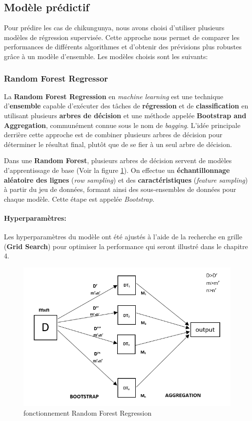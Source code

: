 \subsection{Modèle prédictif}
Pour prédire les cas de chikungunya, nous avons choisi d'utiliser plusieurs modèles de régression supervisée. Cette approche nous permet de comparer les performances de différents algorithmes et d'obtenir des prévisions plus robustes grâce à un modèle d'ensemble. Les modèles choisis sont les suivants:

\subsubsection{Random Forest Regressor}
La \textbf{Random Forest Regression} en \textit{machine learning} est une technique d'\textbf{ensemble} capable d'exécuter des tâches de \textbf{régression} et de \textbf{classification} en utilisant plusieurs \textbf{arbres de décision} et une méthode appelée \textbf{Bootstrap and Aggregation}, communément connue sous le nom de \textit{bagging}. L'idée principale derrière cette approche est de combiner plusieurs arbres de décision pour déterminer le résultat final, plutôt que de se fier à un seul arbre de décision.

Dans une \textbf{Random Forest}, plusieurs arbres de décision servent de modèles d'apprentissage de base (Voir la figure \ref{fig:schemarandomforest}). On effectue un \textbf{échantillonnage aléatoire des lignes} (\textit{row sampling}) et des \textbf{caractéristiques} (\textit{feature sampling}) à partir du jeu de données, formant ainsi des sous-ensembles de données pour chaque modèle. Cette étape est appelée \textit{Bootstrap}.

\paragraph*{Hyperparamètres:}
Les hyperparamètres du modèle ont été ajustés à l'aide de la recherche en grille (\textbf{Grid Search}) pour optimiser la performance qui seront illustré dans le chapitre 4.

\begin{figure}[h!]
	\centering
	\includegraphics[width=0.8\linewidth]{images/schema_random_forest}
	\caption{fonctionnement Random Forest Regression~\cite{randomforestref}}
	\label{fig:schemarandomforest}
\end{figure}

